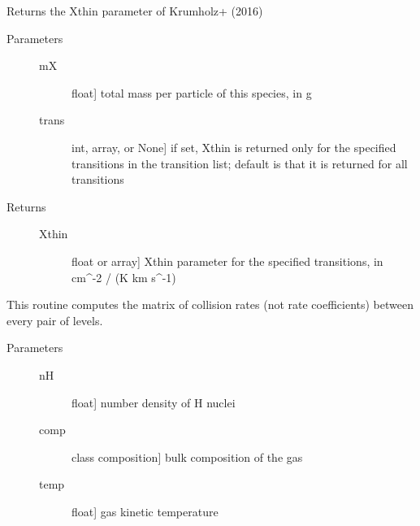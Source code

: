 \documentclass[letterpaper,10pt,english]{sphinxmanual}
\begin{document}
\begin{fulllineitems}
\begin{fulllineitems}
\label{fulldoc:despotic.emitterData.alphathin}
Returns the Xthin parameter of Krumholz+ (2016)
\begin{description}
\item[{Parameters}] \leavevmode\begin{description}
\item[{mX}] \leavevmode{[}float{]}
total mass per particle of this species, in g

\item[{trans}] \leavevmode{[}int, array, or None{]}
if set, Xthin is returned only for the specified
transitions in the transition list; default is that it
is returned for all transitions

\end{description}

\item[{Returns}] \leavevmode\begin{description}
\item[{Xthin}] \leavevmode{[}float or array{]}
Xthin parameter for the specified transitions, in cm\textasciicircum{}-2
/ (K km s\textasciicircum{}-1)

\end{description}

\end{description}

\end{fulllineitems}


\begin{fulllineitems}
\label{fulldoc:despotic.emitterData.collRateMatrix}
This routine computes the matrix of collision rates (not rate
coefficients) between every pair of levels.
\begin{description}
\item[{Parameters}] \leavevmode\begin{description}
\item[{nH}] \leavevmode{[}float{]}
number density of H nuclei

\item[{comp}] \leavevmode{[}class composition{]}
bulk composition of the gas

\item[{temp}] \leavevmode{[}float{]}
gas kinetic temperature


\end{description}
\end{description}
\end{fulllineitems}
\end{fulllineitems}
\end{document}
